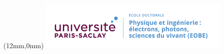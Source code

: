 \ifthispageodd{\newpage\thispagestyle{empty}\null\newpage}{}
\thispagestyle{empty}
\setlength{\columnseprule}{0pt}
\setlength\columnsep{10pt}

\lhead{}
\rhead{}
\rfoot{}
\cfoot{}
\lfoot{}

\noindent 
\begin{textblock*}{61mm}(12mm,0mm)
	\noindent\includegraphics[height=24mm]{Figs/EOBE.png} %
\end{textblock*}

